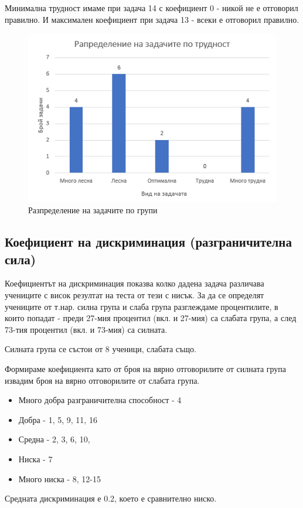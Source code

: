 Минимална трудност имаме при задача 14 с коефициент 0 - никой не е отговорил правилно. И максимален коефициент при задача 13 - всеки е отговорил правилно.
\begin{figure}[H]
    \centering
    \includegraphics[width=\linewidth]{resources/trudnost.png}
    \caption{Разпределение на задачите по групи}
\end{figure}

\subsection{Коефициент на дискриминация (разграничителна сила)}
Коефициентът на дискриминация показва колко дадена задача различава учениците с висок резултат на теста от тези с нисък. За да се определят учениците от т.нар. силна група и  слаба група разглеждаме процентилите, в които попадат - преди 27-мия процентил (вкл. и 27-мия) са слабата група, а след 73-тия процентил (вкл. и 73-мия) са силната.

Силната група се състои от 8 ученици, слабата също.

Формираме коефициента като от броя на вярно отговорилите от силната група извадим броя на вярно отговорилите от слабата група.

\begin{itemize}
    \item Много добра разграничителна способност - 4
    \item Добра - 1, 5, 9, 11, 16
    \item Средна - 2, 3, 6, 10,
    \item Ниска - 7
    \item Много ниска - 8, 12-15
\end{itemize}
Средната дискриминация е 0.2, което е сравнително ниско.

